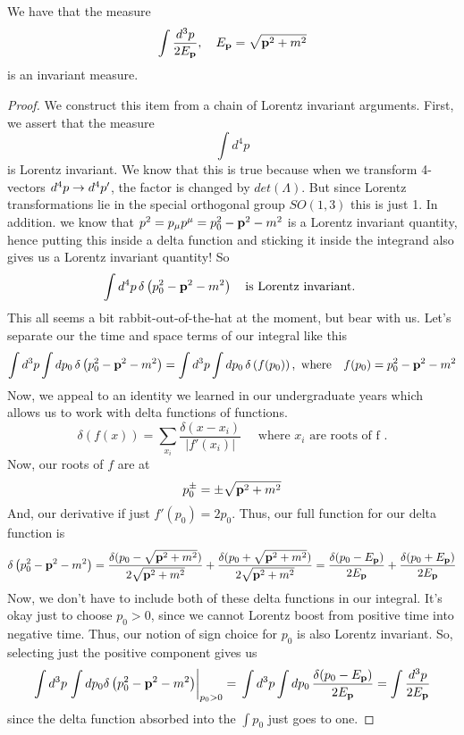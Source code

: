 \begin{thm} 
We have that the measure 
\[ 	
\int \frac{ d^3 p}{2 E_{\mathbf{  p  }} } , \quad E_{\mathbf{  p  }} = \sqrt { \mathbf{  p }^2 + m^2 } 
\] is an invariant measure.

\begin{proof}
We construct this item from a chain of Lorentz invariant arguments. First, we assert that the measure 
\[
\int d^4 p 
\] is Lorentz invariant. We know that this is true because when we transform 4-vectors $d^4 p \rightarrow d^4 p'$, the factor is changed by $det ( \Lambda) $. But since Lorentz transformations lie in the special orthogonal group $SO(1, 3)$ this is just 1. In addition. we know that $p^2  = p_\mu p^\mu = p_0^2 - \mathbf{  p }^2 - m^2 $ is a Lorentz invariant quantity, hence putting this inside a delta function and sticking it inside the integrand also gives us a Lorentz invariant quantity!
So 
\[ 	
\int d^4p \,  \delta \left( p_0^2  - \mathbf{  p }^2 - m^2 \right) \quad \text{is Lorentz invariant. } 
\] This all seems a bit rabbit-out-of-the-hat at the moment, but bear with us. Let's separate our the time and space terms of our integral like this 
\[
\int d^3 p \int dp_0 \, \delta \left( p_0^2 - \mathbf{  p }^2  - m^2 \right)  = \int d^3 p \int dp_0 \,  \delta \left( f (p_0 )\right) , \text{ where}  \quad f( p_0) = p_0^2  - \mathbf{  p } ^2  - m^2 
\] Now, we appeal to an identity we learned in our undergraduate years which allows us to work with delta functions of functions. 
\[	
\delta ( f ( x) )  = \sum_{ x_i } \frac{  \delta ( x - x_i)}{ | f'( x_i) |} \quad \text{ where } x_i \text{ are roots of f }.
\] Now, our roots of $ f$ are at 
\[ 
p_0^{ \pm}  = \pm \sqrt{ \mathbf{  p  }^2 + m^2 } 
\] And, our derivative if just $f' ( p_0 )  = 2 p_0 $. Thus, our full function for our delta function is 
\[	
\delta \left( p_0^2 - \mathbf{  p }^2  - m^2 \right) = \frac{ \delta ( p_0  -  \sqrt{ \mathbf{  p  }^2 + m^2 }  )}{ 2 \sqrt{ \mathbf{  p  }^2 + m^2 } } +  \frac{ \delta ( p_0  +\sqrt{ \mathbf{  p  }^2 + m^2 }  )}{  2\sqrt{ \mathbf{  p  }^2 + m^2 } } = \frac{ \delta ( p_0  -  E_{\mathbf{  p }} )}{ 2 E_{\mathbf{  p }}  } +  \frac{ \delta ( p_0  + E_{\mathbf{  p }}  )}{  2 E_{\mathbf{  p  }}  } 
\] Now, we don't have to include both of these delta functions in our integral. It's okay just to choose $p_0 > 0 $, since we cannot Lorentz boost from positive time into negative time. Thus, our notion of sign choice for $p_0$ is also Lorentz invariant. So, selecting just the positive component 
gives us 
\[ 
\int d^3 p \left. \int dp_0 \delta \left( p_0^2 - \mathbf{  p }^2  - m^2 \right) \right\vert_{p_0 > 0 }  = \,\int d^3 p  \int d p_0 \, \frac{ \delta ( p_0  -  E_{\mathbf{  p }} )}{ 2 E_{\mathbf{  p }}  } = \int \frac{ d^3 p }{ 2 E_ {\mathbf{  p }} } 
\] since the delta function absorbed into the $\int p_0$ just goes to one. 
\end{proof}
\end{thm}  

